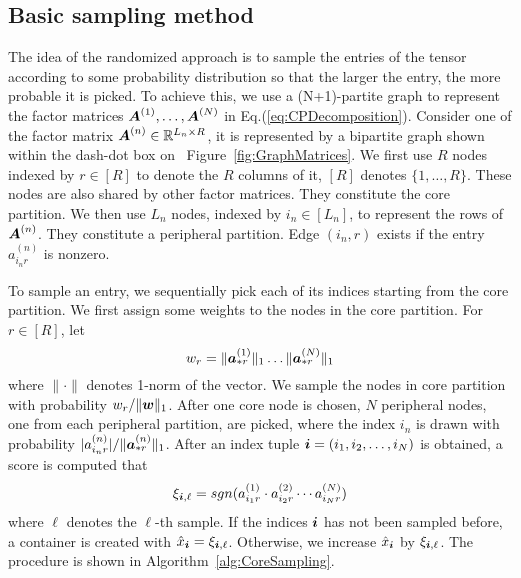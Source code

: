 \documentclass[letterpaper]{article}
\newcommand{\Sca}[3]{{#1}^{(#2)}_{i_#2#3}}%
\newcommand{\anr}[2]{\Sca{a}{#1}{#2}}
\newcommand{\score}[1]{\xi_{\V{i},#1}}
\newcommand{\V}[1]{{\boldsymbol{{\MakeLowercase{#1}}}}}
\newcommand{\ColVec}[3]{\V{#1}^{(#2)}_{#3}}
\newcommand{\NormColA}[2]{\norm{\ColVec{a}{#1}{*#2}}{1}}
\newcommand{\ColVecA}[1]{\V{a}^{(#1)}_{*r}}
\newcommand{\coord}{(i_1,i_2,\ldots,i_N)}
\newcommand{\WeightR}{\NormColA{1}{r}\ldots\NormColA{N}{r}}
\newcommand{\predx}{\hat{x}_{\V{i}}}
\newcommand{\M}[1]{{\boldsymbol{{\MakeUppercase{#1}}}}}
\newcommand{\FacMat}[2]{\M{#1}^{(#2)}}
\newcommand{\norm}[2]{\|#1\|_{#2}}
\newcommand{\Eqn}[1]{Eq.(\ref{eq:#1})}
\newcommand{\Fig}[1]{Figure~\ref{fig:#1}}
\newcommand{\Alg}[1]{Algorithm~\ref{alg:#1}}
\begin{document}
\subsection{Basic sampling method}
The idea of the randomized approach is 
to sample the entries of the tensor according to some probability distribution 
so that the larger the entry, the more probable it is picked. 
To achieve this, we use a (N+1)-partite graph to represent the factor matrices
$\FacMat{A}{1},\ldots,\FacMat{A}{N}$ in \Eqn{CPDecomposition}.
Consider one of the factor matrix $\FacMat{A}{n}\in \mathbb{R}^{L_n \times R}$,
it is represented by a bipartite graph shown within the dash-dot box on ~\Fig{GraphMatrices}.
We first use $R$ nodes indexed by $r\in[R]$ to denote the $R$ columns of it,
$[R]$ denotes $\{1,\ldots,R\}$.
These nodes are also shared by other factor matrices.
They constitute the core partition.
We then use $L_n$ nodes, indexed by $i_n\in [L_n]$,
to represent the rows of $\FacMat{A}{n}$.
They constitute a peripheral partition. 
Edge $(i_n,r)$ exists if the entry $\anr{n}{r}$ is nonzero.

To sample an entry, we sequentially pick each of its indices
starting from the core partition. 
We first assign some weights to the nodes in the core partition. 
For $r\in[R]$, let
\begin{equation}
    w_r = \WeightR
\end{equation}
where $\|\cdot\|$ denotes 1-norm of the vector.
We sample the nodes in core partition with probability $w_r/\norm{\V{W}}{1}$. 
After one core node is chosen, 
$N$ peripheral nodes, one from each peripheral partition, are picked, 
where the index $i_n$ is drawn with probability $|\anr{n}{r}|/\norm{\ColVecA{n}}{1}$. 
After an index tuple $\V{i}=\coord$ is obtained, 
a score is computed that
\begin{align}
\score{\ell}  = sgn(\anr{1}{r}\cdot\anr{2}{r}\cdots\anr{N}{r})
\end{align}
where $\ell$ denotes the $\ell$-th sample. 
If the indices $\V{i}$ has not been sampled before, 
a container is created with $\predx = \score{\ell}$. 
Otherwise, we increase $\predx$ by $\score{\ell}$. 
The procedure is shown in \Alg{CoreSampling}.
\end{document}
